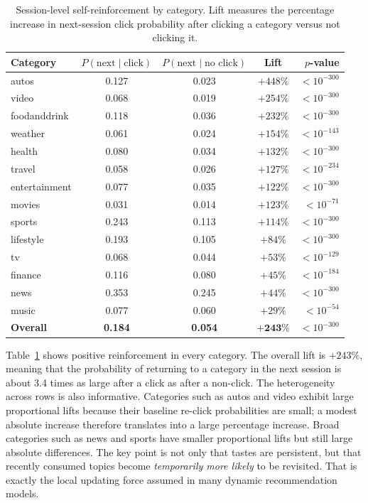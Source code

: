 \documentclass[11pt]{article}
\begin{document}
\begin{table}[ht]
\centering
\caption{Session-level self-reinforcement by category. Lift measures the percentage increase in next-session click probability after clicking a category versus not clicking it.}
\label{tab:selfreinforcement}
\small
\begin{tabular}{lcccr}
\toprule
Category & $P(\text{next} \mid \text{click})$ & $P(\text{next} \mid \text{no click})$ & Lift & $p$-value \\
\midrule
autos & 0.127 & 0.023 & $+448\%$ & $< 10^{-300}$ \\
video & 0.068 & 0.019 & $+254\%$ & $< 10^{-300}$ \\
foodanddrink & 0.118 & 0.036 & $+232\%$ & $< 10^{-300}$ \\
weather & 0.061 & 0.024 & $+154\%$ & $< 10^{-143}$ \\
health & 0.080 & 0.034 & $+132\%$ & $< 10^{-300}$ \\
travel & 0.058 & 0.026 & $+127\%$ & $< 10^{-234}$ \\
entertainment & 0.077 & 0.035 & $+122\%$ & $< 10^{-300}$ \\
movies & 0.031 & 0.014 & $+123\%$ & $< 10^{-71}$ \\
sports & 0.243 & 0.113 & $+114\%$ & $< 10^{-300}$ \\
lifestyle & 0.193 & 0.105 & $+84\%$ & $< 10^{-300}$ \\
tv & 0.068 & 0.044 & $+53\%$ & $< 10^{-129}$ \\
finance & 0.116 & 0.080 & $+45\%$ & $< 10^{-184}$ \\
news & 0.353 & 0.245 & $+44\%$ & $< 10^{-300}$ \\
music & 0.077 & 0.060 & $+29\%$ & $< 10^{-54}$ \\
\midrule
\textbf{Overall} & \textbf{0.184} & \textbf{0.054} & $\boldsymbol{+243\%}$ & $< 10^{-300}$ \\
\bottomrule
\end{tabular}
\end{table}
\FloatBarrier

Table~\ref{tab:selfreinforcement} shows positive reinforcement in every category. The overall lift is $+243\%$, meaning that the probability of returning to a category in the next session is about 3.4 times as large after a click as after a non-click. The heterogeneity across rows is also informative. Categories such as autos and video exhibit large proportional lifts because their baseline re-click probabilities are small; a modest absolute increase therefore translates into a large percentage increase. Broad categories such as news and sports have smaller proportional lifts but still large absolute differences. The key point is not only that tastes are persistent, but that recently consumed topics become \emph{temporarily more likely} to be revisited. That is exactly the local updating force assumed in many dynamic recommendation models.
\end{document}
